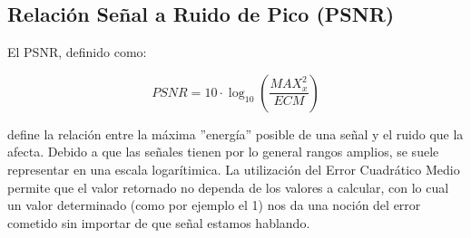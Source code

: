 \subsection {Relaci\'on Señal a Ruido de Pico (PSNR)}

El PSNR, definido como:

$$
\mathit{PSNR} = 10 \cdot \log_{10} \left( \frac{\mathit{MAX}^2_x}{\mathit{ECM}}
\right)
$$

define la relaci\'on entre la m\'axima ''energ\'ia'' posible de una se\~nal y el
ruido que la afecta. Debido a que las se\~nales tienen por lo general rangos
amplios, se suele representar en una escala logar\'itimica. La utilizaci\'on del
 Error Cuadr\'atico Medio permite que el valor retornado no dependa de los
valores a calcular, con lo cual un valor determinado (como por ejemplo el 1) nos
da una noci\'on del error cometido sin importar de que se\~nal estamos hablando.
